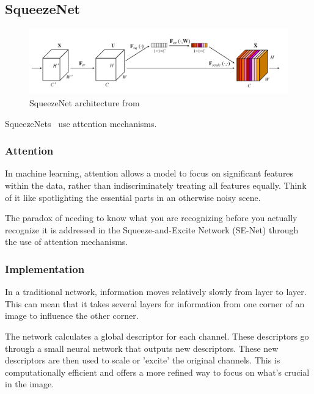 \documentclass[11pt]{article}
\begin{document}
\subsection{SqueezeNet}

\begin{figure}[H]
    \centering
    \includegraphics[trim={0 0 0 0},clip,width=\linewidth]{figures/SqueezeNet.png}
    \caption{SqueezeNet architecture from~\cite{SqueezeNet}} \label{fig:squeezeNet-architecture}
\end{figure}

SqueezeNets~\cite{SqueezeNet} use attention mechanisms. 

\subsubsection{Attention}

In machine learning, attention allows a model to focus on significant features within the data, rather than indiscriminately treating all features equally. Think of it like spotlighting the essential parts in an otherwise noisy scene.

The paradox of needing to know what you are recognizing before you actually recognize it is addressed in the Squeeze-and-Excite Network (SE-Net) through the use of attention mechanisms.

\subsubsection{Implementation}

In a traditional network, information moves relatively slowly from layer to layer. This can mean that it takes several layers for information from one corner of an image to influence the other corner.

The network calculates a global descriptor for each channel. These descriptors go through a small neural network that outputs new descriptors. These new descriptors are then used to scale or 'excite' the original channels. This is computationally efficient and offers a more refined way to focus on what's crucial in the image.
\end{document}
